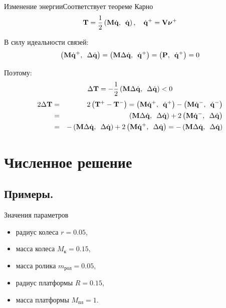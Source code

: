 \documentclass{beamer}
\begin{document}
\begin{frame}{Изменение энергии}{Соответствует теореме Карно}
    $$ \eqTquad, \quad \eqDqVnu $$

    В силу идеальности связей:
    $$ \logicWorkZero $$
    
    Поэтому:
        $$ \eqDeltaT $$
    \begin{eqnarray*}
        2\Delta\ke & = & 2\left(\ke^+ - \ke^-\right) = \dotp{\mke\dqposle}{\dqposle} - \dotp{\mke\dqdo}{\dqdo} \\
        & = & \dotp{\mke\deltadq}{\deltadq} + 2\dotp{\mke\dqdo}{\deltadq} \\
        & = & -\dotp{\mke\deltadq}{\deltadq} + 2\dotp{\mke\dqposle}{\deltadq} = -\dotp{\mke\deltadq}{\deltadq}
    \end{eqnarray*}
\end{frame}

\section{Численное решение}

\subsection{Примеры.}

\begin{frame}{Значения параметров}
    \begin{itemize}
        \item радиус колеса $r = 0.05$,
        \item масса колеса $ M_{\text{к}} = 0.15$, 
        \item масса ролика $m_{\text{рол}} = 0.05$, 
        \item радиус платформы $R = 0.15$, 
        \item масса платформы $M_{\text{пл}} = 1$.
    \end{itemize}
\end{frame}
\end{document}
